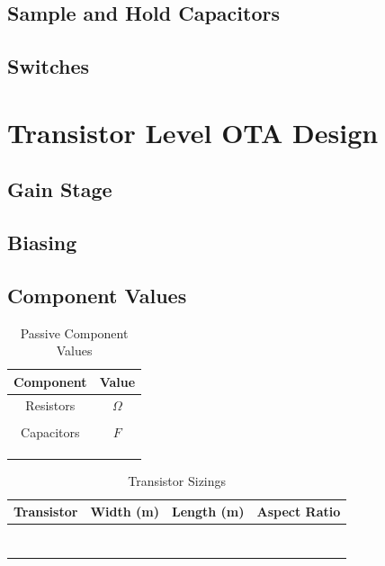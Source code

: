 \documentclass[journal]{IEEEtran}
\begin{document}
\subsection{Sample and Hold Capacitors}

\subsection{Switches}

\section{Transistor Level OTA Design}
\subsection{Gain Stage}

\subsection{Biasing}

\subsection{Component Values}

\begin{table}
\centering
\caption{Passive Component Values}
\label{tab:passive_elements}
\begin{tabular}{|c|c|}
\hline Component & Value \\ 
\hline Resistors & $\Omega$ \\ 
\hline  &  \\ 
\hline Capacitors & $F$ \\ 
\hline  &  \\ 
\hline  &  \\ 
\hline  &  \\ 
\hline 
\end{tabular} 
\end{table}

\begin{table}
\centering
\caption{Transistor Sizings}
\label{tab:trans_sizes}
\begin{tabular}{|c|c|c|c|}
\hline Transistor & Width (m) & Length (m) & Aspect Ratio \\ 
\hline  &  &  &  \\ 
\hline  &  &  &  \\ 
\hline  &  &  &  \\ 
\hline  &  &  &  \\ 
\hline  &  &  &  \\ 
\hline  &  &  &  \\ 
\hline  &  &  &  \\ 
\hline 
\end{tabular} 
\end{table}
\end{document}
